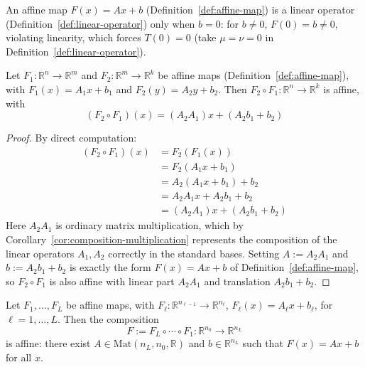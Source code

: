 		\begin{remark}
			\label{rem:affine-not-linear}
			An affine map $F(x)=Ax+b$ (Definition~\ref{def:affine-map}) is a linear operator (Definition~\ref{def:linear-operator}) only when $b=0$: for $b\neq0$, $F(0)=b\neq0$, violating linearity, which forces $T(0)=0$ (take $\mu=\nu=0$ in Definition~\ref{def:linear-operator}).
		\end{remark}
		
		\begin{proposition}
			\label{prop:affine-composition}
			Let $F_1:\mathbb{R}^n\to\mathbb{R}^m$ and $F_2:\mathbb{R}^m\to\mathbb{R}^k$ be affine maps (Definition~\ref{def:affine-map}), with $F_1(x)=A_1x+b_1$ and $F_2(y)=A_2y+b_2$. Then $F_2\circ F_1:\mathbb{R}^n\to\mathbb{R}^k$ is affine, with
			\[
				(F_2\circ F_1)(x) = (A_2A_1)x + (A_2b_1+b_2)
			\]
		\end{proposition}
		
		\begin{proof}
			By direct computation:
			\begin{align*}
				(F_2\circ F_1)(x) &= F_2(F_1(x)) \\
				&= F_2(A_1x+b_1) \\
				&= A_2(A_1x+b_1)+b_2 \\
				&= A_2A_1x + A_2b_1 + b_2 \\
				&= (A_2A_1)x + (A_2b_1+b_2)
			\end{align*}
			Here $A_2A_1$ is ordinary matrix multiplication, which by Corollary~\ref{cor:composition-multiplication} represents the composition of the linear operators $A_1,A_2$ correctly in the standard bases. 
			Setting $A:=A_2A_1$ and $b:=A_2b_1+b_2$ is exactly the form $F(x)=Ax+b$ of Definition~\ref{def:affine-map}, so $F_2\circ F_1$ is also affine with linear part $A_2A_1$ and translation $A_2b_1+b_2$.
		\end{proof}
		
		\begin{corollary}
			\label{cor:affine-depth-collapse}
			Let $F_1,\dots,F_L$ be affine maps, with $F_\ell:\mathbb{R}^{n_{\ell-1}}\to\mathbb{R}^{n_\ell}$, $F_\ell(x)=A_\ell x+b_\ell$, for $\ell=1,\dots,L$. Then the composition
			\[
				F := F_L\circ\cdots\circ F_1 : \mathbb{R}^{n_0}\to\mathbb{R}^{n_L}
			\]
			is affine: there exist $A\in\mathrm{Mat}(n_L,n_0,\mathbb{R})$ and $b\in\mathbb{R}^{n_L}$ such that $F(x)=Ax+b$ for all $x$.
		\end{corollary}
		
